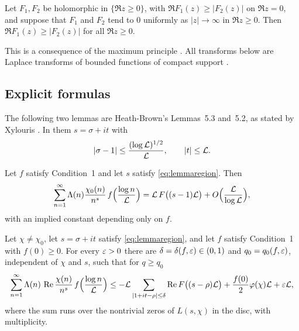 \begin{inp}\label{inp:comparison}
Let $F_1,F_2$ be holomorphic in $\{\Re z\ge0\}$, with $\Re F_1(z)\ge|F_2(z)|$ on $\Re z=0$, and
suppose that $F_1$ and $F_2$ tend to $0$ uniformly as $|z|\to\infty$ in $\Re z\ge0$. Then
$\Re F_1(z)\ge|F_2(z)|$ for all $\Re z\ge0$.
\end{inp}

This is a consequence of the maximum principle
\cite{PhragmenLindelof1908extension,Titchmarsh1939theory}. All transforms below are Laplace
transforms of bounded functions of compact support \cite{Widder1941laplace}.

\subsection{Explicit formulas}
The following two lemmas are Heath-Brown's Lemmas~5.3 and~5.2, as stated by Xylouris
\cite[Lemmas~3.1 and~3.2, p.~18]{Xylouris2011nullstellen}. In them $s=\sigma+it$ with
\begin{equation}\label{eq:lemmaregion}
  |\sigma-1|\le\frac{(\log\mathcal{L})^{1/2}}{\mathcal{L}},\qquad|t|\le\mathcal{L} .
\end{equation}

\begin{inp}\label{inp:X31}
Let $f$ satisfy Condition~1 and let $s$ satisfy \eqref{eq:lemmaregion}. Then
\[
  \sum_{n=1}^\infty\Lambda(n)\frac{\chi_0(n)}{n^s}\,f\Bigl(\frac{\log n}{\mathcal{L}}\Bigr)=\mathcal{L}\,F\bigl((s-1)\mathcal{L}\bigr)
  +O\Bigl(\frac{\mathcal{L}}{\log\mathcal{L}}\Bigr),
\]
with an implied constant depending only on $f$.
\end{inp}

\begin{inp}\label{inp:X32}
Let $\chi\ne\chi_0$, let $s=\sigma+it$ satisfy \eqref{eq:lemmaregion}, and let $f$ satisfy
Condition~1 with $f(0)\ge0$. For every $\varepsilon>0$ there are
$\delta=\delta(f,\varepsilon)\in(0,1)$ and $q_0=q_0(f,\varepsilon)$, independent of $\chi$ and $s$, such that
for $q\ge q_0$
\[
  \sum_{n=1}^\infty\Lambda(n)\,\operatorname{Re}\frac{\chi(n)}{n^s}\,f\Bigl(\frac{\log n}{\mathcal{L}}\Bigr)\le
  -\mathcal{L}\sum_{|1+it-\rho|\le\delta}\operatorname{Re} F\bigl((s-\rho)\mathcal{L}\bigr)+\frac{f(0)}2\varphi(\chi)\mathcal{L}+\varepsilon\mathcal{L},
\]
where the sum runs over the nontrivial zeros of $L(s,\chi)$ in the disc, with multiplicity.
\end{inp}

